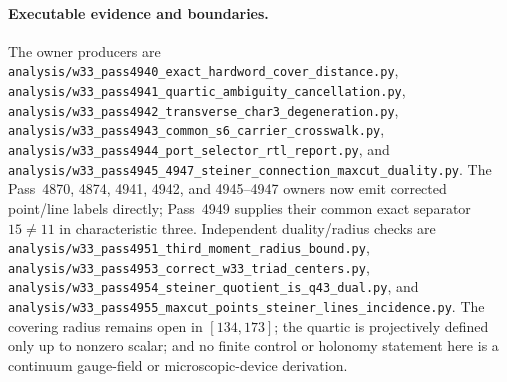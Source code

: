 \paragraph{Executable evidence and boundaries.}
The owner producers are
\texttt{analysis/w33\_pass4940\_exact\_hardword\_cover\_distance.py},
\texttt{analysis/w33\_pass4941\_quartic\_ambiguity\_cancellation.py},
\texttt{analysis/w33\_pass4942\_transverse\_char3\_degeneration.py},
\texttt{analysis/w33\_pass4943\_common\_s6\_carrier\_crosswalk.py},
\texttt{analysis/w33\_pass4944\_port\_selector\_rtl\_report.py}, and
\texttt{analysis/w33\_pass4945\_4947\_steiner\_connection\_maxcut\_duality.py}.
The Pass~4870, 4874, 4941, 4942, and 4945--4947 owners now emit corrected
point/line labels directly; Pass~4949 supplies their common exact separator
$15\ne11$ in characteristic three.  Independent duality/radius checks are
\texttt{analysis/w33\_pass4951\_third\_moment\_radius\_bound.py},
\texttt{analysis/w33\_pass4953\_correct\_w33\_triad\_centers.py},
\texttt{analysis/w33\_pass4954\_steiner\_quotient\_is\_q43\_dual.py}, and
\texttt{analysis/w33\_pass4955\_maxcut\_points\_steiner\_lines\_incidence.py}.
The covering radius remains open in $[134,173]$; the quartic is projectively
defined only up to nonzero scalar; and no finite control or holonomy statement
here is a continuum gauge-field or microscopic-device derivation.

